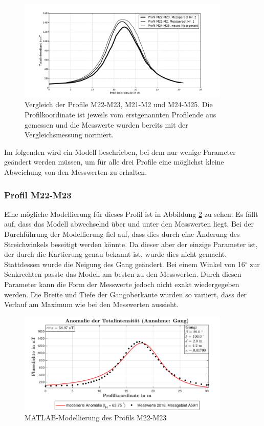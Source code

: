 \begin{figure}
 \centering
 \includegraphics[width=0.9\textwidth]{fig/Vergleich_nahe_Profile.pdf}
 \caption[Vergleich der Profile M22-M23, M21-M2 und M24-M25]{Vergleich der Profile M22-M23, M21-M2 und M24-M25. Die Profilkoordinate ist jeweils vom erstgenannten Profilende aus gemessen und die Messwerte wurden bereits mit der Vergleichsmessung normiert.}
 \label{fig:Vergleich_Profile}
\end{figure}

Im folgenden wird ein Modell beschrieben, bei dem nur wenige Parameter geändert werden müssen, um für alle drei Profile eine möglichst kleine Abweichung von den Messwerten zu erhalten.

\subsubsection{Profil M22-M23}

Eine mögliche Modellierung für dieses Profil ist in Abbildung \ref{fig:modM22} zu sehen. Es fällt auf, dass das Modell abwechselnd über und unter den Messwerten liegt. Bei der Durchführung der Modellierung fiel auf, dass dies durch eine Änderung des Streichwinkels beseitigt werden könnte. Da dieser aber der einzige Parameter ist, der durch die Kartierung genau bekannt ist, wurde dies nicht gemacht. Stattdessen wurde die Neigung des Gang geändert. Bei einem Winkel von 16$^\circ$ zur Senkrechten passte das Modell am besten zu den Messwerten. Durch diesen Parameter kann die Form der Messwerte jedoch nicht exakt wiedergegeben werden. Die Breite und Tiefe der Gangoberkante wurden so variiert, dass der Verlauf am Maximum wie bei den Messwerten aussieht.

\begin{figure}
 \centering
 \includegraphics[width=0.9\textwidth]{fig/modM22}
 \caption{MATLAB-Modellierung des Profils M22-M23}
 \label{fig:modM22}
\end{figure}

